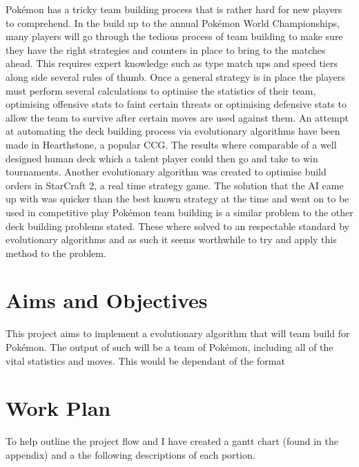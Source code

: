 \documentclass[a4paper]{article}
\newcommand{\Pokemon}{Pok\'{e}mon}
\begin{document}
\Pokemon{} has a tricky team building process that is rather hard for new players to comprehend. In the build up to the annual \Pokemon{} World Championships, many players will go through the tedious process of team building to make sure they have the right strategies and counters in place to bring to the matches ahead\cite{worldsOverview}. This requires expert knowledge such as type match ups and speed tiers along side several rules of thumb. Once a general strategy is in place the players must perform several calculations to optimise the statistics of their team, optimising offensive stats to faint certain threats or optimising defensive stats to allow the team to survive after certain moves are used against them.
An attempt at automating the deck building process via evolutionary algorithms have been made in Hearthstone, a popular CCG\cite{hearthstoneAI}. The results where comparable of a well designed human deck which a talent player could then go and take to win tournaments. Another evolutionary algorithm was created to optimise build orders in StarCraft 2, a real time strategy game. The solution that the AI came up with was quicker than the best known strategy at the time and went on to be used in competitive play\cite{starcraftEA}
\Pokemon{} team building is a similar problem to the other deck building problems stated. These where solved to an respectable standard by evolutionary algorithms and as such it seems worthwhile to try and apply this method to the problem.

\section{Aims and Objectives}
This project aims to implement a evolutionary algorithm that will team build for \Pokemon{}. The output of such will be a team of \Pokemon{}, including all of the vital statistics and moves. This would be dependant of the format

\section{Work Plan}
To help outline the project flow and I have created a gantt chart (found in the appendix) and a the following descriptions of each portion.
\end{document}
